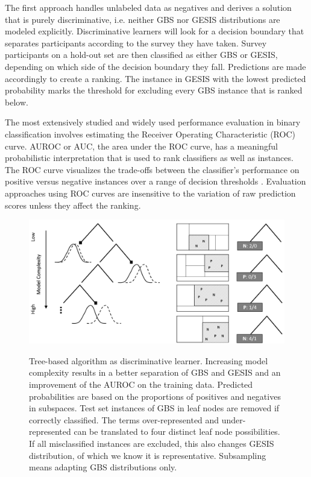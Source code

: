 The first approach handles unlabeled data as negatives and derives a solution that is purely discriminative, i.e. neither GBS nor GESIS distributions are modeled explicitly. Discriminative learners will look for a decision boundary that separates participants according to the survey they have taken. Survey participants on a hold-out set are then classified as either GBS or GESIS, depending on which side of the decision boundary they fall. Predictions are made accordingly to create a ranking. The instance in GESIS with the lowest predicted probability marks the threshold for excluding every GBS instance that is ranked below.

The most extensively studied and widely used performance evaluation in binary classification involves estimating the Receiver Operating Characteristic (ROC) curve. AUROC or AUC, the area under the ROC curve, has a meaningful probabilistic interpretation that is used to rank classifiers as well as instances. The ROC curve visualizes the trade-offs between the classifier's performance on positive versus negative instances over a range of decision thresholds \cite{roc}. Evaluation approaches using ROC curves are insensitive to the variation of raw prediction scores unless they affect the ranking.

\vspace{1cm}
\begin{figure}[ht]
	\begin{center}
		\captionsetup{width= 380pt}
		\includegraphics[scale=0.32,angle=0]{fig/tree}
		\label{project}
		\caption{Tree-based algorithm as discriminative learner. Increasing model complexity results in a better separation of GBS and GESIS and an improvement of the AUROC on the training data. Predicted probabilities are based on the proportions of positives and negatives in subspaces. Test set instances of GBS in leaf nodes are removed if correctly classified. The terms over-represented and under-represented can be translated to four distinct leaf node possibilities. If all misclassified instances are excluded, this also changes GESIS distribution, of which we know it is representative. Subsampling means adapting GBS distributions only.}
	\end{center}
\end{figure}

